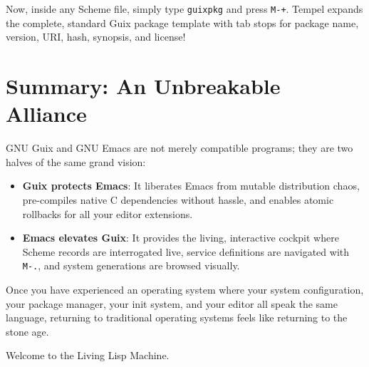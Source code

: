 Now, inside any Scheme file, simply type \texttt{guixpkg} and press \texttt{M-+}. Tempel expands the complete, standard Guix package template with tab stops for package name, version, URI, hash, synopsis, and license!

\section{Summary: An Unbreakable Alliance}

GNU Guix and GNU Emacs are not merely compatible programs; they are two halves of the same grand vision:

\begin{itemize}
  \item \textbf{Guix protects Emacs}: It liberates Emacs from mutable distribution chaos, pre-compiles native C dependencies without hassle, and enables atomic rollbacks for all your editor extensions.
  \item \textbf{Emacs elevates Guix}: It provides the living, interactive cockpit where Scheme records are interrogated live, service definitions are navigated with \texttt{M-.}, and system generations are browsed visually.
\end{itemize}

Once you have experienced an operating system where your system configuration, your package manager, your init system, and your editor all speak the same language, returning to traditional operating systems feels like returning to the stone age. 

Welcome to the Living Lisp Machine.
